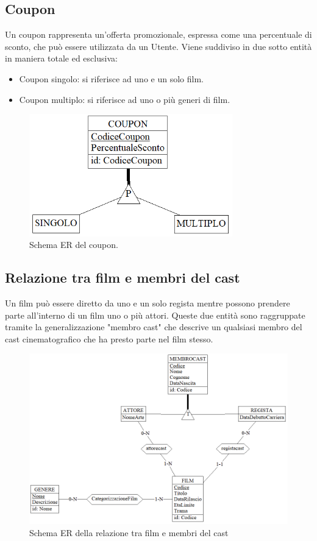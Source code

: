 \documentclass[a4paper,12pt]{report}
\begin{document}
	\subsection{Coupon}
	Un coupon rappresenta un'offerta promozionale, espressa come una percentuale di sconto, che può essere utilizzata da un Utente. Viene suddiviso in due sotto entità in maniera totale ed esclusiva:
	\begin{itemize}
			\item Coupon singolo: si riferisce ad uno e un solo film.
			\item Coupon multiplo: si riferisce ad uno o più generi di film.
	\end{itemize}
	\begin{figure}[H]
		\centering
		\includegraphics[width=250pt]{ER/coupon.png}
		\caption{Schema ER del coupon.}
	\end{figure}
	\subsection{Relazione tra film e membri del cast}
	Un film può essere diretto da uno e un solo regista mentre possono prendere parte all'interno di un film uno o più attori. Queste due entità sono raggruppate tramite la generalizzazione "membro cast" che descrive un qualsiasi membro del cast cinematografico che ha presto parte nel film stesso.
	\begin{figure}[H]
		\centering
		\includegraphics[width=0.7\linewidth]{ER/filmcast.png}
		\caption{Schema ER della relazione tra film e membri del cast}
	\end{figure}
\end{document}
